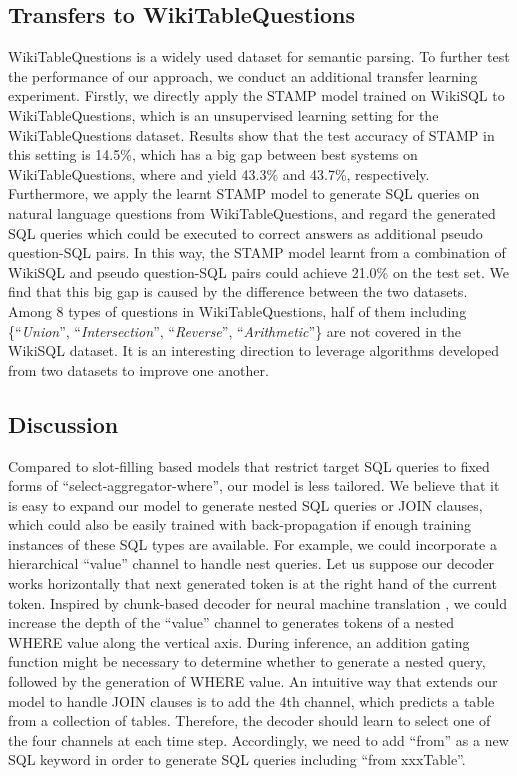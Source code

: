 \documentclass[11pt,a4paper]{article}
\begin{document}
\subsection{Transfers to WikiTableQuestions}
WikiTableQuestions \cite{pasupat-liang:2015:ACL-IJCNLP} is a widely used dataset for semantic parsing.
To further test the performance of our approach, we conduct an additional transfer learning \mbox{experiment}.
Firstly, we directly apply the STAMP model trained on WikiSQL to WikiTableQuestions, which is an unsupervised learning setting for the WikiTableQuestions dataset.
Results show that the test accuracy of STAMP in this setting is 14.5\%, which has a big gap between best systems on  WikiTableQuestions, where  and  yield 43.3\% and 43.7\%, respectively.
Furthermore, we apply the learnt STAMP model to generate SQL queries on natural language questions from WikiTableQuestions, and regard the generated SQL queries which could be executed to correct answers as additional pseudo question-SQL pairs. 
In this way, the STAMP model learnt from a combination of WikiSQL and pseudo question-SQL pairs could achieve 21.0\% on the test set.
We find that this big gap is caused by the difference between the two datasets.
Among 8 types of questions in WikiTableQuestions, half of them including \{``\textit{Union}'', ``\textit{Intersection}'', ``\textit{Reverse}'', ``\textit{Arithmetic}''\} are not covered in the WikiSQL dataset.
It is an interesting direction to leverage algorithms developed from two datasets to improve one another. 


\subsection{Discussion}
Compared to slot-filling based models that restrict target SQL queries to fixed forms of ``select-aggregator-where'', our model is less tailored. We believe that it is easy to expand our model to generate nested SQL queries or JOIN clauses, which could also be easily trained with back-propagation if enough training instances of these SQL types are available.  For example, we could incorporate a hierarchical ``value'' channel to handle nest queries. Let us suppose our decoder works horizontally that next generated token is at the right hand of the current token. Inspired by chunk-based decoder for neural machine translation \cite{ishiwatari-EtAl:2017:Long}, we could increase the depth of the ``value'' channel to generates tokens of a nested WHERE value along the vertical axis. During inference, an addition gating function might be necessary to determine whether to generate a nested query, followed by the generation of WHERE value. 
An intuitive way that extends our model to handle JOIN clauses is to add the 4th channel, which predicts a table from a collection of tables. Therefore, the decoder should learn to select one of the four channels at each time step. Accordingly, we need to add ``from'' as a new SQL keyword in order to generate SQL queries including ``from xxxTable''.
\end{document}
